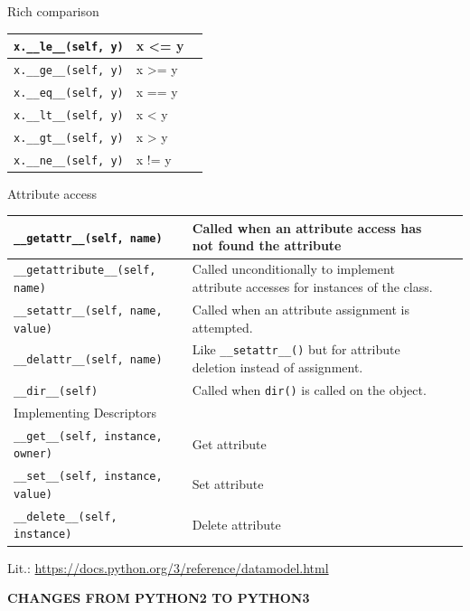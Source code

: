 \documentclass[9pt,a4wide]{extarticle}
\begin{document}
\bigskip

Rich comparison

\begin{supertabular}{|l|p{12.5cm}|c|}\hline
{\tt x.\_\_le\_\_(self, y)}  &  x <= y    \\ \hline
{\tt x.\_\_ge\_\_(self, y)}  &  x >= y    \\ \hline
{\tt x.\_\_eq\_\_(self, y)}  &  x == y    \\ \hline
{\tt x.\_\_lt\_\_(self, y)}  &  x < y     \\ \hline
{\tt x.\_\_gt\_\_(self, y)}  &  x > y     \\ \hline
{\tt x.\_\_ne\_\_(self, y)}  &  x != y    \\ \hline
\end{supertabular}

\bigskip

Attribute access

\begin{supertabular}{|l|p{12cm}|c|}\hline
{\tt \_\_getattr\_\_(self, name)}  & Called when an attribute access has not found the attribute      \\ \hline
{\tt \_\_getattribute\_\_(self, name)}  &  Called unconditionally to implement attribute accesses for instances of the class.      \\ \hline
{\tt \_\_setattr\_\_(self, name, value)}  &  Called when an attribute assignment is attempted.      \\ \hline
{\tt \_\_delattr\_\_(self, name)}  & Like {\tt \_\_setattr\_\_()} but for attribute deletion instead of assignment.       \\ \hline
{\tt \_\_dir\_\_(self)}  & Called when {\tt dir()} is called on the object.  \\ \hline\hline
Implementing Descriptors &   \\ \hline
{\tt \_\_get\_\_(self, instance, owner)}  & Get attribute      \\ \hline
{\tt \_\_set\_\_(self, instance, value)}  & Set attribute      \\ \hline
{\tt \_\_delete\_\_(self, instance)}  & Delete attribute      \\ \hline
\end{supertabular}



Lit.: \url{https://docs.python.org/3/reference/datamodel.html}


\bigskip
{\LARGE\bf CHANGES FROM PYTHON2 TO PYTHON3}
{}
\end{document}
